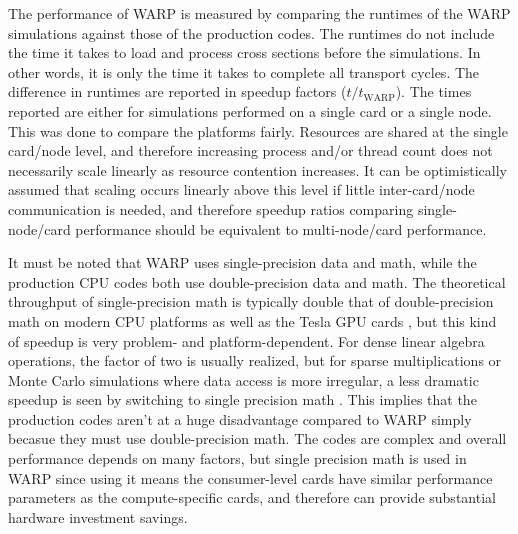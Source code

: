 \documentclass[preprint,12pt]{elsarticle}
\begin{document}
The performance of WARP is measured by comparing the runtimes of the WARP simulations against those of the production codes.  The runtimes do not include the time it takes to load and process cross sections before the simulations.  In other words, it is only the time it takes to complete all transport cycles.  The difference in runtimes are reported in speedup factors ($t/t_\mathrm{WARP}$).  The times reported are either for simulations performed on a single card or a single node.  This was done to compare the platforms fairly.  Resources are shared at the single card/node level, and therefore increasing process and/or thread count does not necessarily scale linearly as resource contention increases.  It can be optimistically assumed that scaling occurs linearly above this level if little inter-card/node communication is needed, and therefore speedup ratios comparing single-node/card performance should be equivalent to multi-node/card performance.

It must be noted that WARP uses single-precision data and math, while the production CPU codes both use double-precision data and math.  The theoretical throughput of single-precision math is typically double that of double-precision math on modern CPU platforms as well as the Tesla GPU cards \cite{cuda,double_single_compare_matrix,double_single_compare_gpu}, but this kind of speedup is very problem- and platform-dependent.  For dense linear algebra operations, the factor of two is usually realized, but for sparse multiplications or Monte Carlo simulations where data access is more irregular, a less dramatic speedup is seen by switching to single precision math \cite{single_cpu2,single_cpu3,Buttari2008UsingMP,chan_mic}.  This implies that the production codes aren't at a huge disadvantage compared to WARP simply becasue they must use double-precision math.  The codes are complex and overall performance depends on many factors, but single precision math is used in WARP since using it means the consumer-level cards have similar performance parameters as the compute-specific cards, and therefore can provide substantial hardware investment savings.
\end{document}

